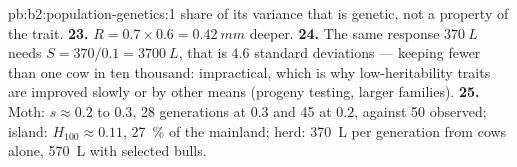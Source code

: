 \begin{solution}{pb:b2:population-genetics:1}
share of its variance that is genetic, not a property of the trait.
\textbf{23.} $R = 0.7\times 0.6 = \qty{0.42}{mm}$ deeper.
\textbf{24.} The same response $\qty{370}{L}$ needs $S = 370/0.1 =
\qty{3700}{L}$, that is $4.6$ standard deviations --- keeping fewer
than one cow in ten thousand: impractical, which is why
low-heritability traits are improved slowly or by other means
(progeny testing, larger families).
\textbf{25.} Moth: $s \approx 0.2$ to $0.3$, 28 generations at $0.3$
and 45 at $0.2$, against 50 observed; island: $H_{100} \approx 0.11$,
\qty{27}{\%} of the mainland; herd: \qty{370}{L} per generation from
cows alone, \qty{570}{L} with selected bulls.
\end{solution}
